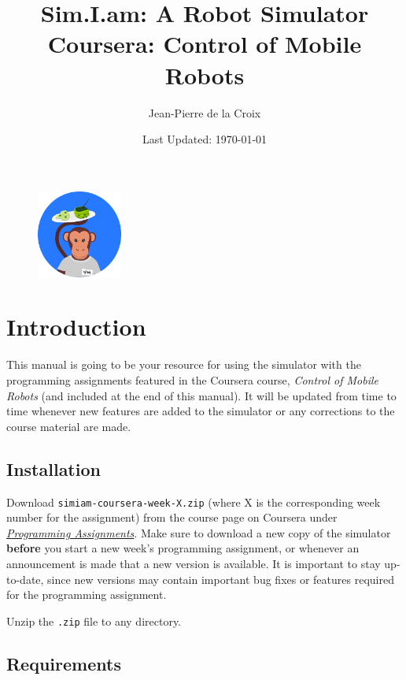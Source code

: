 \documentclass[10pt]{article}
\begin{document}
\begin{figure}
  \centering
  \includegraphics[width=0.25\textwidth]{images/simiam-round-logo.png}
\end{figure}

\title{{\huge{\bf{Sim.I.am: A Robot Simulator }}} \\
         Coursera: Control of Mobile Robots}
\author{Jean-Pierre de la Croix}
\date{Last Updated: \today}

\maketitle
\tableofcontents
\newpage
\section{Introduction}
This manual is going to be your resource for using the simulator with the programming assignments featured in the Coursera course, \textit{Control of Mobile Robots} (and included at the end of this manual). It will be updated from time to time whenever new features are added to the simulator or any corrections to the course material are made.

\subsection{Installation}

Download \texttt{simiam-coursera-week-X.zip} (where X is the corresponding week number for the assignment) from the course page on Coursera under \href{https://class.coursera.org/conrob-002/wiki/ProgrammingAssignments}{\textit{Programming Assignments}}. Make sure to download a new copy of the simulator \textbf{before} you start a new week's programming assignment, or whenever an announcement is made that a new version is available. It is important to stay up-to-date, since new versions may contain important bug fixes or features required for the programming assignment.

Unzip the \texttt{.zip} file to any directory.

\subsection{Requirements}
\end{document}
